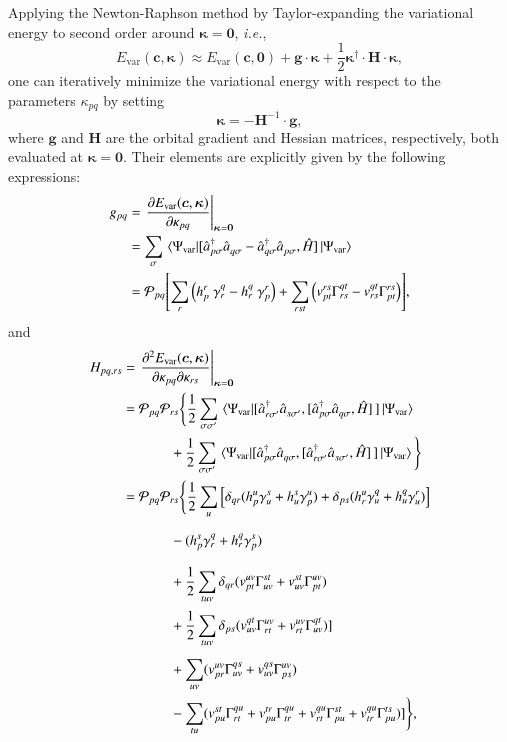 \documentclass[aip,jcp,reprint,noshowkeys,superscriptaddress,floatfix]{revtex4-1}
\newcommand{\ie}{\textit{i.e.}}
\newcommand{\hH}{\Hat{H}}
\newcommand{\cre}[1]{\Hat{a}_{#1}^{\dagger}}
\newcommand{\ani}[1]{\Hat{a}_{#1}^{}}
\newcommand{\bO}{\boldsymbol{0}}
\newcommand{\bH}{\boldsymbol{H}}
\newcommand{\bg}{\boldsymbol{g}}
\newcommand{\bk}{\boldsymbol{\kappa}}
\newcommand{\bc}{\boldsymbol{c}}
\newcommand{\cP}{\mathcal{P}}
\newcommand{\Evar}{E_\text{var}}
\newcommand{\Psivar}{\Psi_\text{var}}
\begin{document}
Applying the Newton-Raphson method by Taylor-expanding the variational energy to second order around $\bk = \bO$, \ie,
\begin{equation}
	\label{eq:EvarTaylor}
	\Evar(\bc,\bk) \approx \Evar(\bc,\bO) + \bg \cdot \bk + \frac{1}{2} \bk^{\dag} \cdot \bH \cdot \bk,
\end{equation}
one can iteratively minimize the variational energy with respect to the parameters $\kappa_{pq}$ by setting
\begin{equation}
	\label{eq:kappa_newton}
	\bk = - \bH^{-1} \cdot \bg,
\end{equation}
where $\bg$ and $\bH$ are the orbital gradient and Hessian matrices, respectively, both evaluated at $\bk = \bO$.
Their elements are explicitly given by the following expressions: \cite{Bozkaya_2011,Henderson_2014a}
\begin{equation}
\begin{split}
	g_{pq}
	&=  \left. \pdv{\Evar(\bc,\bk)}{\kappa_{pq}}\right|_{\bk=\bO}
	\\
	&= \sum_{\sigma} \mel{\Psivar}{\comm*{\cre{p\sigma} \ani{q\sigma} - \cre{q\sigma} \ani{p\sigma}}{\hH}}{\Psivar}
	\\
	&= \cP_{pq} \qty[ \sum_r \left( h_p^r \ \gamma_r^q - h_r^q \ \gamma_p^r \right) + \sum_{rst} \qty( v_{pt}^{rs} \Gamma_{rs}^{qt} - v_{rs}^{qt} \Gamma_{pt}^{rs} ) ],
\end{split}
\end{equation}
and
\begin{equation}
\begin{split}
	H_{pq,rs}
	& = \left. \pdv{\Evar(\bc,\bk)}{\kappa_{pq}}{\kappa_{rs}}\right|_{\bk=\bO}
	\\
	& = \cP_{pq} \cP_{rs} \Bigg\{
	\frac{1}{2} \sum_{\sigma\sigma'} \mel*{\Psivar}{\comm*{\cre{r \sigma'} \ani{s \sigma'}}{\comm*{\cre{p \sigma} \ani{q \sigma}}{\hH}}}{\Psivar}
	\\
	& \phantom{\cP_{pq} \cP_{rs} \Bigg\{} + \frac{1}{2} \sum_{\sigma\sigma'} \mel*{\Psivar}{\comm*{\cre{p \sigma} \ani{q \sigma}}{\comm*{\cre{r \sigma'} \ani{s \sigma'}}{\hH}}}{\Psivar}
	\Bigg\}
	\\
	& = \cP_{pq} \cP_{rs} \Bigg\{
	\frac{1}{2} \sum_u \qty[ \delta_{qr}(h_p^u \gamma_u^s + h_u^s \gamma_p^u) + \delta_{ps}(h_r^u \gamma_u^q + h_u^q \gamma_u^r)]
	\\
	& \phantom{\cP_{pq} \cP_{rs} \Bigg\{} - (h_p^s \gamma_r^q + h_r^q \gamma_p^s)
	\\
	& \phantom{\cP_{pq} \cP_{rs} \Bigg\{} + \frac{1}{2} \sum_{tuv} \delta_{qr}(v_{pt}^{uv} \Gamma_{uv}^{st} + v_{uv}^{st} \Gamma_{pt}^{uv})
	\\
	& \phantom{\cP_{pq} \cP_{rs} \Bigg\{} + \frac{1}{2} \sum_{tuv} \delta_{ps}(v_{uv}^{qt} \Gamma_{rt}^{uv} + v_{rt}^{uv}\Gamma_{uv}^{qt})]
	\\
	& \phantom{\cP_{pq} \cP_{rs} \Bigg\{} + \sum_{uv} (v_{pr}^{uv} \Gamma_{uv}^{qs} + v_{uv}^{qs}  \Gamma_{ps}^{uv})
	\\
	& \phantom{\cP_{pq} \cP_{rs} \Bigg\{} - \sum_{tu} (v_{pu}^{st} \Gamma_{rt}^{qu}+v_{pu}^{tr} \Gamma_{tr}^{qu}+v_{rt}^{qu}\Gamma_{pu}^{st} + v_{tr}^{qu}\Gamma_{pu}^{ts})]
	\Bigg\},
\end{split}
\end{equation}
\end{document}
